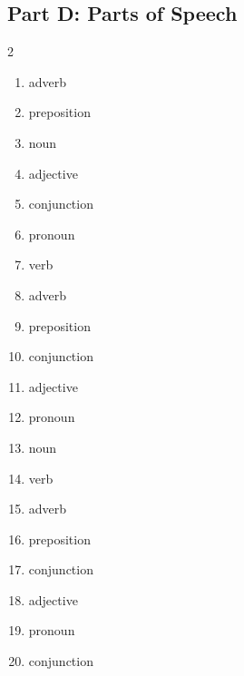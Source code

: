 \documentclass[11pt]{article}
\begin{document}
\subsection*{Part D: Parts of Speech}
\begin{multicols}{2}
\begin{enumerate}
  \item adverb
  \item preposition
  \item noun
  \item adjective
  \item conjunction
  \item pronoun
  \item verb
  \item adverb
  \item preposition
  \item conjunction
  \item adjective
  \item pronoun
  \item noun
  \item verb
  \item adverb
  \item preposition
  \item conjunction
  \item adjective
  \item pronoun
  \item conjunction
\end{enumerate}
\end{multicols}
\end{document}
